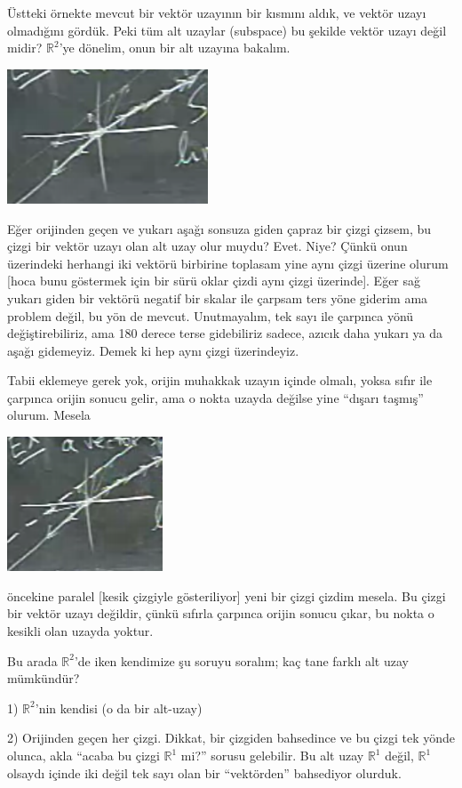 \documentclass[12pt,fleqn]{article}\usepackage{../../common}
\begin{document}
Üstteki örnekte mevcut bir vektör uzayının bir kısmını aldık, ve vektör
uzayı olmadığını gördük. Peki tüm alt uzaylar (subspace) bu şekilde vektör
uzayı değil midir? $\mathbb{R}^2$'ye dönelim, onun bir alt uzayına
bakalım. 

\includegraphics[height=4cm]{5_03.png}

Eğer orijinden geçen ve yukarı aşağı sonsuza giden çapraz bir çizgi çizsem,
bu çizgi bir vektör uzayı olan alt uzay olur muydu? Evet. Niye? Çünkü onun
üzerindeki herhangi iki vektörü birbirine toplasam yine aynı çizgi üzerine
olurum [hoca bunu göstermek için bir sürü oklar çizdi aynı çizgi
üzerinde]. Eğer sağ yukarı giden bir vektörü negatif bir skalar ile çarpsam
ters yöne giderim ama problem değil, bu yön de mevcut. Unutmayalım, tek
sayı ile çarpınca yönü değiştirebiliriz, ama 180 derece terse gidebiliriz
sadece, azıcık daha yukarı ya da aşağı gidemeyiz. Demek ki hep aynı çizgi
üzerindeyiz. 

Tabii eklemeye gerek yok, orijin muhakkak uzayın içinde olmalı, yoksa sıfır
ile çarpınca orijin sonucu gelir, ama o nokta uzayda değilse yine ``dışarı
taşmış'' olurum. Mesela 

\includegraphics[height=4cm]{5_04.png}

öncekine paralel [kesik çizgiyle gösteriliyor] yeni bir çizgi çizdim
mesela. Bu çizgi bir vektör uzayı değildir, çünkü sıfırla çarpınca orijin
sonucu çıkar, bu nokta o kesikli olan uzayda yoktur.

Bu arada $\mathbb{R}^2$'de iken kendimize şu soruyu soralım; kaç tane
farklı alt uzay mümkündür? 

1) $\mathbb{R}^2$'nin kendisi (o da bir alt-uzay)

2) Orijinden geçen her çizgi. Dikkat, bir çizgiden bahsedince ve bu çizgi
tek yönde olunca, akla ``acaba bu çizgi $\mathbb{R}^1$ mi?'' sorusu
gelebilir. Bu alt uzay $\mathbb{R}^1$ değil, $\mathbb{R}^1$ olsaydı içinde
iki değil tek sayı olan bir ``vektörden'' bahsediyor olurduk. 
\end{document}
